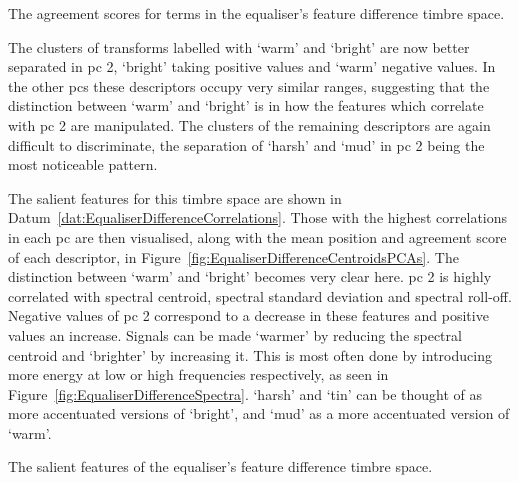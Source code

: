 			\begin{table}[h!]
				\centering
				
				\caption{The agreement scores for terms in the 
					 equaliser's feature difference timbre space.}
				\label{tab:EqualiserDifferenceAgreements}
			\end{table}

			The clusters of transforms labelled with `warm' and `bright' are now better separated in
			\acrshort{pc} 2, `bright' taking positive values and `warm' negative values. In the other
			\acrshort{pc}s these descriptors occupy very similar ranges, suggesting that the distinction
			between `warm' and `bright' is in how the features which correlate with \acrshort{pc} 2 are
			manipulated. The clusters of the remaining descriptors are again difficult to discriminate, the
			separation of `harsh' and `mud' in \acrshort{pc} 2 being the most noticeable pattern.

			The salient features for this timbre space are shown in
			Datum~\ref{dat:EqualiserDifferenceCorrelations}. Those with the highest correlations in each
			\acrshort{pc} are then visualised, along with the mean position and agreement score of each
			descriptor, in Figure~\ref{fig:EqualiserDifferenceCentroidsPCAs}. The distinction between `warm'
			and `bright' becomes very clear here. \acrshort{pc} 2 is highly correlated with spectral centroid,
			spectral standard deviation and spectral roll-off. Negative values of \acrshort{pc} 2 correspond to
			a decrease in these features and positive values an increase. Signals can be made `warmer' by
			reducing the spectral centroid and `brighter' by increasing it. This is most often done by
			introducing more energy at low or high frequencies respectively, as seen in
			Figure~\ref{fig:EqualiserDifferenceSpectra}. `harsh' and `tin' can be thought of as more
			accentuated versions of `bright', and `mud' as a more accentuated version of `warm'.

			\begin{datum}[h!]
				\centering
				\begin{minipage}{0.9\textwidth}
					
				\end{minipage}
				\caption{The salient features of the equaliser's
					 feature difference timbre space.}
				\label{dat:EqualiserDifferenceCorrelations}
			\end{datum}


